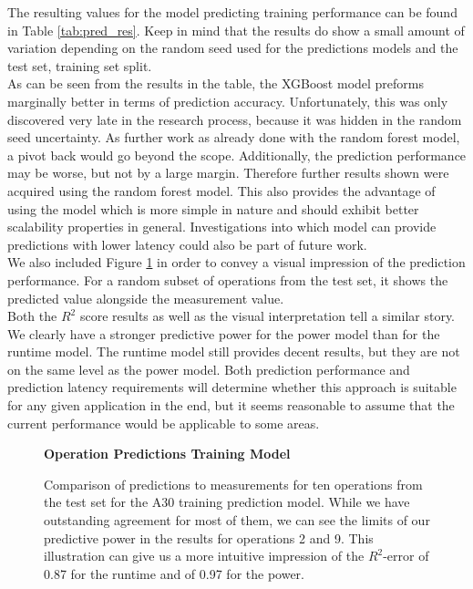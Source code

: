 The resulting values for the model predicting training performance can be found in Table \ref{tab:pred_res}. Keep in mind that the results do show a small amount of variation depending on the random seed used for the predictions models and the test set, training set split. \\
As can be seen from the results in the table, the XGBoost model preforms marginally better in terms of prediction accuracy. Unfortunately, this was only discovered very late in the research process, because it was hidden in the random seed uncertainty. As further work as already done with the random forest model, a pivot back would go beyond the scope. Additionally, the prediction performance may be worse, but not by a large margin. Therefore further results shown were acquired using the random forest model. This also provides the advantage of using the model which is more simple in nature and should exhibit better scalability properties in general. Investigations into which model can provide predictions with lower latency could also be part of future work. \\
We also included Figure \ref{fig:testsetoperations} in order to convey a visual impression of the prediction performance. For a random subset of operations from the test set, it shows the predicted value alongside the measurement value. \\
Both the $R^2$ score results as well as the visual interpretation tell a similar story. We clearly have a stronger predictive power for the power model than for the runtime model. The runtime model still provides decent results, but they are not on the same level as the power model. Both prediction performance and prediction latency requirements will determine whether this approach is suitable for any given application in the end, but it seems reasonable to assume that the current performance would be applicable to some areas.


\begin{figure}[htbp]
    \centering
    \parbox{1.1\textwidth}{\centering\textbf{Operation Predictions Training Model}}
    \caption{Comparison of predictions to measurements for ten operations from the test set for the A30 training prediction model. While we have outstanding agreement for most of them, we can see the limits of our predictive power in the results for operations 2 and 9. This illustration can give us a more intuitive impression of the $R^2$-error of 0.87 for the runtime and of 0.97 for the power.}
    \label{fig:testsetoperations}
\end{figure}


